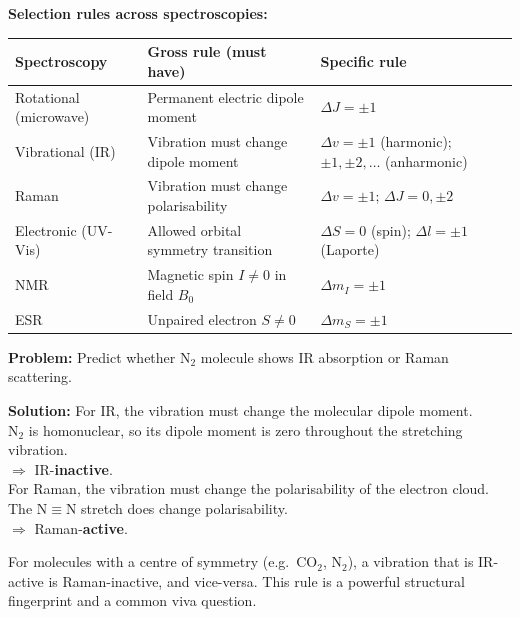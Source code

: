 \documentclass[12pt,a4paper]{article}
\begin{document}
\textbf{Selection rules across spectroscopies:}\par\noindent
\begin{tabularx}{\linewidth}{|B{2.8cm}|Y|Y|}
\hline
\textbf{Spectroscopy} & \textbf{Gross rule (must have)} & \textbf{Specific rule} \\
\hline
Rotational (microwave) & Permanent electric dipole moment & $\Delta J=\pm 1$ \\
\hline
Vibrational (IR) & Vibration must change dipole moment & $\Delta v=\pm 1$ (harmonic); $\pm 1, \pm 2,\ldots$ (anharmonic) \\
\hline
Raman & Vibration must change polarisability & $\Delta v=\pm 1$; $\Delta J=0,\pm 2$ \\
\hline
Electronic (UV-Vis) & Allowed orbital symmetry transition & $\Delta S=0$ (spin); $\Delta l=\pm 1$ (Laporte) \\
\hline
NMR & Magnetic spin $I\neq 0$ in field $B_0$ & $\Delta m_I=\pm 1$ \\
\hline
ESR & Unpaired electron $S\neq 0$ & $\Delta m_S=\pm 1$ \\
\hline
\end{tabularx}

\begin{tcolorbox}[examplebox, title={Solved Example: Why \texorpdfstring{$\mathrm{N_2}$}{N2} Shows No IR but Shows Raman}]
\textbf{Problem:} Predict whether $\mathrm{N_2}$ molecule shows IR absorption or Raman scattering.

\textbf{Solution:} For IR, the vibration must change the molecular dipole moment.\\
$\mathrm{N_2}$ is homonuclear, so its dipole moment is zero throughout the stretching vibration. \\$\Rightarrow$ IR-\textbf{inactive}.\\
For Raman, the vibration must change the polarisability of the electron cloud. The $\mathrm{N{\equiv}N}$ stretch does change polarisability. \\$\Rightarrow$ Raman-\textbf{active}.
\end{tcolorbox}

\begin{tcolorbox}[masonbox, title={Mutual Exclusion Principle}]
For molecules with a centre of symmetry (e.g.\ $\mathrm{CO_2}$, $\mathrm{N_2}$), a vibration that is IR-active is Raman-inactive, and vice-versa. This rule is a powerful structural fingerprint and a common viva question.
\end{tcolorbox}
\end{document}
